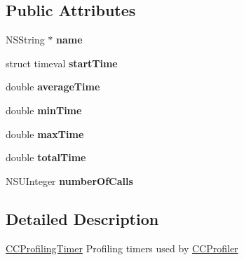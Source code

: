 \subsection*{Public Attributes}
\begin{DoxyCompactItemize}
\item 
\hypertarget{interface_c_c_profiling_timer_a0964646b11a0fd1fd5000f3c0353a992}{N\-S\-String $\ast$ {\bfseries name}}\label{interface_c_c_profiling_timer_a0964646b11a0fd1fd5000f3c0353a992}

\item 
\hypertarget{interface_c_c_profiling_timer_aa597424995a185b597c9cc919fc67495}{struct timeval {\bfseries start\-Time}}\label{interface_c_c_profiling_timer_aa597424995a185b597c9cc919fc67495}

\item 
\hypertarget{interface_c_c_profiling_timer_a925a78feb17092d1241b6e040fb31c79}{double {\bfseries average\-Time}}\label{interface_c_c_profiling_timer_a925a78feb17092d1241b6e040fb31c79}

\item 
\hypertarget{interface_c_c_profiling_timer_adfe8194e434cea351d286b493072854c}{double {\bfseries min\-Time}}\label{interface_c_c_profiling_timer_adfe8194e434cea351d286b493072854c}

\item 
\hypertarget{interface_c_c_profiling_timer_a353b36dd239650b6df039bec1a4b52f4}{double {\bfseries max\-Time}}\label{interface_c_c_profiling_timer_a353b36dd239650b6df039bec1a4b52f4}

\item 
\hypertarget{interface_c_c_profiling_timer_a0bcf0bfcc42c88ff4c280228753c776d}{double {\bfseries total\-Time}}\label{interface_c_c_profiling_timer_a0bcf0bfcc42c88ff4c280228753c776d}

\item 
\hypertarget{interface_c_c_profiling_timer_ae3bc1b62a3e1b239d94be6dc9a1cd4d3}{N\-S\-U\-Integer {\bfseries number\-Of\-Calls}}\label{interface_c_c_profiling_timer_ae3bc1b62a3e1b239d94be6dc9a1cd4d3}

\end{DoxyCompactItemize}


\subsection{Detailed Description}
\hyperlink{interface_c_c_profiling_timer}{C\-C\-Profiling\-Timer} Profiling timers used by \hyperlink{interface_c_c_profiler}{C\-C\-Profiler} 

